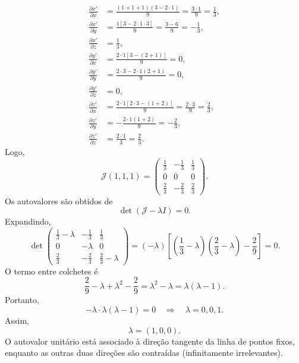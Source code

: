 \documentclass[12pt,a4paper]{article}
\newcommand{\pd}[2]{\frac{\partial #1}{\partial #2}}
\begin{document}
\begin{align}
    \pd{x'}{x}
    &=
    \frac{(1+1+1)(3-2\cdot1)}{9}
    =
    \frac{3\cdot1}{9}
    =
    \frac13,
    \\[4pt]
    \pd{x'}{y}
    &=
    \frac{1[3-2\cdot1\cdot3]}{9}
    =
    \frac{3-6}{9}
    =
    -\frac13,
    \\[4pt]
    \pd{x'}{z}
    &=
    \frac{1}{3},
    \\[4pt]
    \pd{y'}{x}
    &=
    \frac{2\cdot1[3-(2+1)]}{9}
    =
    0,
    \\[4pt]
    \pd{y'}{y}
    &=
    \frac{2\cdot3-2\cdot1(2+1)}{9}
    =
    0,
    \\[4pt]
    \pd{y'}{z}
    &=
    0,
    \\[4pt]
    \pd{z'}{x}
    &=
    \frac{2\cdot1[2\cdot3-(1+2)]}{9}
    =
    \frac{2\cdot3}{9}
    =
    \frac23,
    \\[4pt]
    \pd{z'}{y}
    &=
    -\frac{2\cdot1(1+2)}{9}
    =
    -\frac23,
    \\[4pt]
    \pd{z'}{z}
    &=
    \frac{2\cdot1}{3}
    =
    \frac23.
\end{align}
%
Logo,
%
\begin{equation}
    \mathcal J(1,1,1)
    =
    \begin{pmatrix}
        \frac13 & -\frac13 & \frac13 \\[4pt]
        0 & 0 & 0 \\[4pt]
        \frac23 & -\frac23 & \frac23
    \end{pmatrix}.
\end{equation}
%
Os autovalores são obtidos de
%
\begin{equation}
    \det(\mathcal J-\lambda I)=0.
\end{equation}
%
Expandindo,
%
\begin{equation}
    \det
    \begin{pmatrix}
        \frac13-\lambda & -\frac13 & \frac13 \\[4pt]
        0 & -\lambda & 0 \\[4pt]
        \frac23 & -\frac23 & \frac23-\lambda
    \end{pmatrix}
    =
    (-\lambda)
    \left[
        \left(\frac13-\lambda\right)
        \left(\frac23-\lambda\right)
        -
        \frac29
    \right]
    =
    0.
\end{equation}
%
O termo entre colchetes é
%
\begin{equation}
    \frac{2}{9}
    -
    \lambda
    +
    \lambda^2
    -
    \frac{2}{9}
    =
    \lambda^2-\lambda
    =
    \lambda(\lambda-1).
\end{equation}
%
Portanto,
%
\begin{equation}
    -\lambda\cdot\lambda(\lambda-1)=0
    \quad\Longrightarrow\quad
    \lambda=0,0,1.
\end{equation}
%
Assim,
%
\begin{equation}
    \boxed{
    \lambda=(1,0,0).
    }
\end{equation}
%
O autovalor unitário está associado à direção tangente da linha de
pontos fixos, enquanto as outras duas direções são contraídas
(infinitamente irrelevantes).
\end{document}
